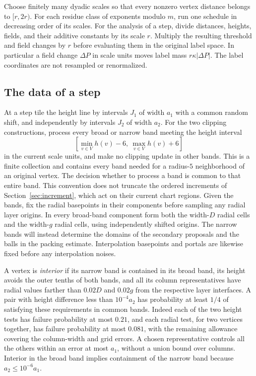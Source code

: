 Choose finitely many dyadic scales so that every nonzero vertex distance
belongs to $[r,2r)$. For each residue class of exponents modulo $m$, run one
schedule in decreasing order of its scales. For the analysis of a step,
divide distances, heights, fields, and their additive constants by its
scale $r$. Multiply the resulting threshold and field changes by $r$
before evaluating them in the original label space. In particular a field
change $\Delta P$ in scale units moves label mass
$r\kappa|\Delta P|$. The label coordinates are not resampled or
renormalized.

\subsection{The data of a step}\label{sets:setup}
At a step tile the height line by intervals $J_1$ of width $a_1$ with a
common random shift, and independently by intervals $J_2$ of width $a_2$.
For the two clipping constructions, process every broad or narrow band
meeting the height interval
\[
 [\min_{v\in V}h(v)-6,\ \max_{v\in V}h(v)+6]
\]
in the current scale units, and make no clipping update in other bands. This is a
finite collection and contains every band needed for a radius-$5$
neighborhood of an original vertex. The decision whether to process a
band is common to that entire band. This convention does not truncate the
ordered increments of Section~\ref{sec:increment}, which act on their
current chart regions. Given the bands, fix the radial basepoints in
their components before sampling any radial layer origins. In every
broad-band component form both the width-$D$ radial cells
and the width-$g$ radial cells, using independently shifted origins.
The narrow bands will instead determine the domains of the secondary
proposals and the balls in the packing estimate. Interpolation
basepoints and portals are likewise fixed before
any interpolation noises.

A vertex is \emph{interior} if its narrow band is contained in its broad
band, its height avoids the outer tenths of both bands, and all its column
representatives have radial values farther than $0.02D$ and $0.02g$ from
the respective layer interfaces. A pair with height difference less than
$10^{-4}a_2$ has probability at least $1/4$ of satisfying these requirements
in common bands. Indeed each of the two height tests has failure probability
at most $0.21$, and each radial test, for two vertices together, has failure
probability at most $0.081$, with the remaining allowance covering the
column-width and grid errors. A chosen representative controls all the
others within an error at most $a_1$, without a union bound over columns.
Interior in the broad band implies containment of the narrow band because
$a_2\le10^{-6}a_1$.

